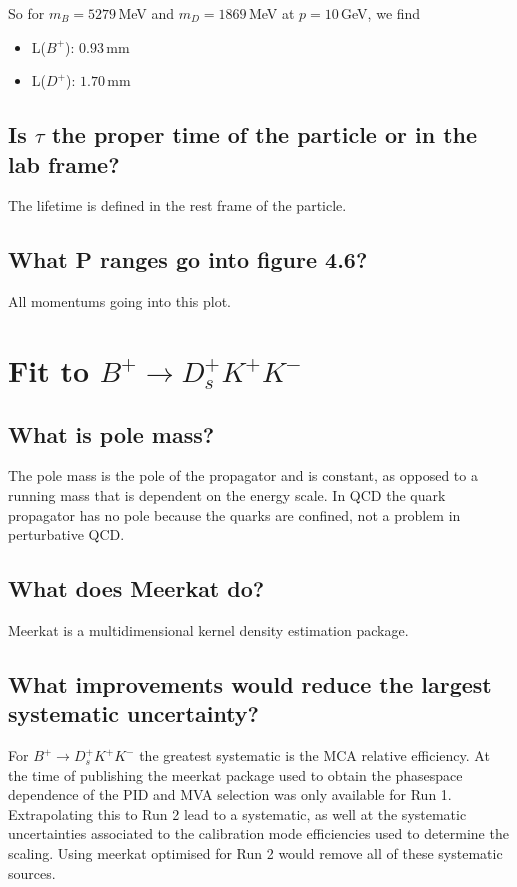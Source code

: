 \documentclass[12pt]{article}
\begin{document}
So for $m_{B} = 5279\,$MeV and $m_{D} = 1869\,$MeV at $p = 10\,$GeV, we find 

\begin{itemize}
\item L($B^{+}$): $0.93\,$mm
\item L($D^{+}$): $1.70\,$mm 
\end{itemize}

\subsection{Is $\tau$ the proper time of the particle or in the lab frame?}

The lifetime is defined in the rest frame of the particle. 

\subsection{What P ranges go into figure 4.6?}
All momentums going into this plot.

\section{Fit to $B^{+} \rightarrow D_{s}^{+} K^{+} K^{-}$ }
\subsection{What is pole mass?}
The pole mass is the pole of the propagator and is constant, as opposed to a running mass that is dependent on the energy scale. In QCD the quark propagator has no pole because the quarks are confined, not a problem in perturbative QCD.


\subsection{What does Meerkat do?}
Meerkat is a multidimensional kernel density estimation package. 

\subsection{What improvements would reduce the largest systematic uncertainty?}
For $B^+ \rightarrow D_{s}^+ K^+ K^-$ the greatest systematic is the MCA relative efficiency. At the time of publishing the meerkat package used to obtain the phasespace dependence of the PID and MVA selection was only available for Run 1. Extrapolating this to Run 2 lead to a systematic, as well at the systematic uncertainties associated to the calibration mode efficiencies used to determine the scaling. Using meerkat optimised for Run 2 would remove all of these systematic sources.
\end{document}

